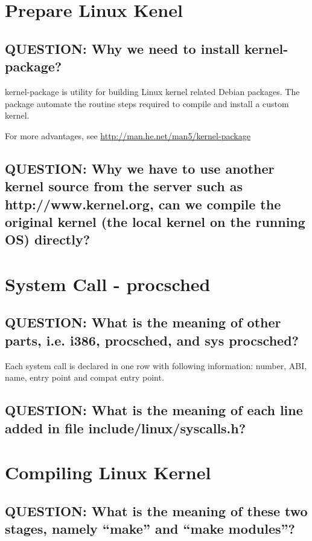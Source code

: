 \section{Prepare Linux Kenel}

\subsection{QUESTION: Why we need to install kernel-package?}

kernel-package is utility for building Linux kernel related Debian packages. The package automate the routine steps required to compile and install a custom kernel.

\noindent For more advantages, see \url{http://man.he.net/man5/kernel-package}

\subsection{QUESTION: Why we have to use another kernel source from the server such as http://www.kernel.org, can we compile the original kernel (the local kernel on the running OS) directly?}



\section{System Call - procsched}

\subsection{QUESTION: What is the meaning of other parts, i.e. i386, procsched, and sys procsched?}

Each system call is declared in one row with following information: number, ABI, name, entry point and compat entry point.


\subsection{QUESTION: What is the meaning of each line added in file include/linux/syscalls.h?}


\section{Compiling Linux Kernel}

\subsection{QUESTION: What is the meaning of these two stages, namely “make” and “make modules”?}


